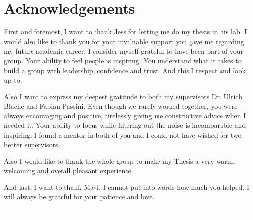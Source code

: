\section*{Acknowledgements}
First and foremost, I want to thank Jess for letting me do my thesis in his lab. I would also like to thank you for your invaluable support you gave me regarding my future academic career. I consider myself grateful to have been part of your group. Your ability to feel people is inspiring. You understand what it takes to build a group with leadership, confidence and trust. And this I respect and look up to. 

Also I want to express my deepest gratitude to both my supervisors Dr. Ulrich Blache and Fabian Passini. Even though we rarely worked together, you were always encouraging and positive, tirelessly giving me constructive advice when I needed it. Your ability to focus while filtering out the noise is incomparable and inspiring. I found a mentor in both of you and I could not have wished for two better supervisors. 


Also I would like to thank the whole group to make my Thesis a very warm, welcoming and overall pleasant experience. 


And last, I want to thank Mavi. I cannot put into words how much you helped. I will always be grateful for your patience and love.  

\clearpage
\textcolor{white}{Yeah}
\clearpage
